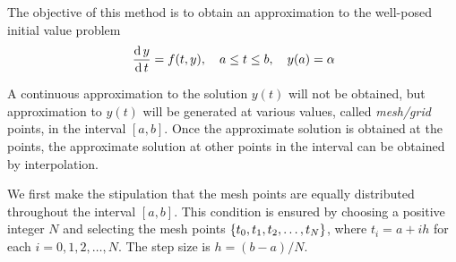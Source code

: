 \documentclass[../main-sheet.tex]{subfiles}
\begin{document}
        The objective of this method is to obtain an approximation to the well-posed initial value problem
        \begin{equation}
            \,\frac{\mathrm{d}\,y}{\mathrm{d}\,t}=f(t,y),\quad a\leq t\leq b,\quad y(a)=\alpha
            \label{eq:euler1}
        \end{equation}
        \begin{note}
            A continuous approximation to the solution \(y(t)\) will not be obtained, but approximation to \(y(t)\) will be generated at various values, called \emph{mesh/grid} points, in the interval \([a,b]\).
            Once the approximate solution is obtained at the points, the approximate solution at other points in the interval can be obtained by interpolation.
        \end{note}

        We first make the stipulation that the mesh points are equally distributed throughout the interval \([a,b]\).
        This condition is ensured by choosing a positive integer \(N\) and selecting the mesh points \(\left\{t_0,t_1,t_2,\dots,t_N\right\}\), where \(t_i=a+ih\) for each \(i=0,1,2,\dots,N\).
        The step size is \(h=(b-a)/N\).
\end{document}
